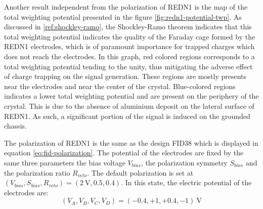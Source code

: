 Another result independent from the polarization of REDN1 is the map of the total weighting potential presented in the figure \ref{fig:redn1-potential-twp}.  As discussed in \ref{ref:shockley-ramo}, the Shockley-Ramo theorem indicates that this total weighting potential indicates the quality of the Faraday cage formed by the REDN1 electrodes, which is of paramount importance for trapped charges which does not reach the electrodes. 
In this graph, red colored regions corresponds to a total weighting potential tending to the unity, thus mitigating the adverse effect of charge trapping on the signal generation. These regions are mostly presents near the electrodes and near the center of the crystal. 
Blue-colored regions indicates a lower total weighting potential and are present on the periphery of the crystal. This is due to the absence of aluminium deposit on the lateral surface of REDN1. As such, a significant portion of the signal is induced on the grounded chassis.

The polarization of REDN1 is the same as the design FID38 which is displayed in equation \ref{eq:fid-polarization}. The potential of the electrodes are fixed by the same three parameters the bias voltage $V_{bias}$, the polarization symmetry $S_{bias}$ and the polarization ratio $R_{veto}$.
The default polarization is set at $\left( V_{bias}, S_{bias}, R_{veto} \right) = (\SI{2}{\volt}, 0.5, 0.4)$. In this state, the electric potential of the electrodes are:
\begin{equation}
(V_A, V_B, V_C, V_D) = (-0.4, +1, +0.4, -1)\ \si{\volt}
\end{equation}

